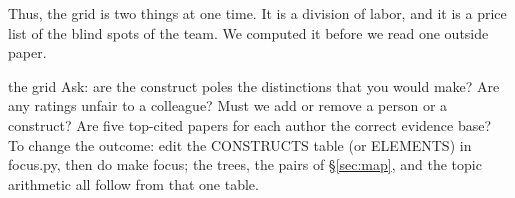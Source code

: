 Thus, the grid is two things at one time.
It is a division of labor, and it is a price list of the blind spots
of the team.
We computed it before we read one outside paper.

\begin{pause}{the grid}
Ask: are the construct poles the distinctions that you would make?
Are any ratings unfair to a colleague?
Must we add or remove a person or a construct?
Are five top-cited papers for each author the correct evidence
base?\\[0.2em] To change the outcome: edit the {\ttfamily CONSTRUCTS}
table (or {\ttfamily ELEMENTS}) in {\ttfamily focus.py}, then do
{\ttfamily make focus}; the trees, the pairs of \S\ref{sec:map}, and
the topic arithmetic all follow from that one table.
\end{pause}
